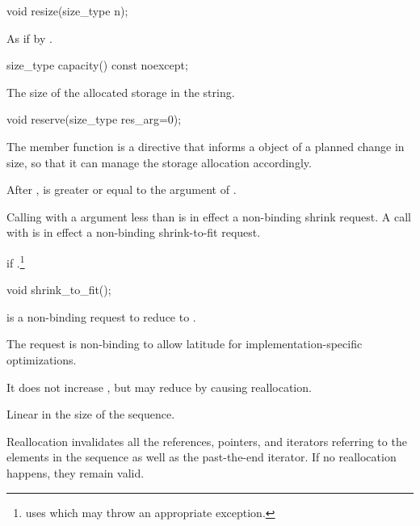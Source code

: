 %
\begin{itemdecl}
void resize(size_type n);
\end{itemdecl}

\begin{itemdescr}
\pnum
\effects
As if by .
\end{itemdescr}

%
\begin{itemdecl}
size_type capacity() const noexcept;
\end{itemdecl}

\begin{itemdescr}
\pnum
\returns
The size of the allocated storage in the string.
\end{itemdescr}

%
\begin{itemdecl}
void reserve(size_type res_arg=0);
\end{itemdecl}

\begin{itemdescr}
\pnum
The member function
is a directive that informs a
object of a planned change in size,
so that it can manage the storage allocation accordingly.

\pnum
\effects
After
,
is greater or equal to the argument of
.
\begin{note}
Calling
with a  argument less than
is in effect a non-binding shrink request.
A call with
is in effect a non-binding shrink-to-fit request.
\end{note}

\pnum
\throws
{}
if
.\footnote{
uses
which may throw an appropriate exception.}
\end{itemdescr}

%
\begin{itemdecl}
void shrink_to_fit();
\end{itemdecl}

\begin{itemdescr}
\pnum
\effects {} is a non-binding request to reduce
 to . \begin{note} The request is non-binding to
allow latitude for implementation-specific optimizations. \end{note}
It does not increase , but may reduce 
by causing reallocation.

\pnum
\complexity Linear in the size of the sequence.

\pnum
\remarks Reallocation invalidates all the references, pointers, and iterators
referring to the elements in the sequence as well as the past-the-end iterator.
If no reallocation happens, they remain valid.
\end{itemdescr}


